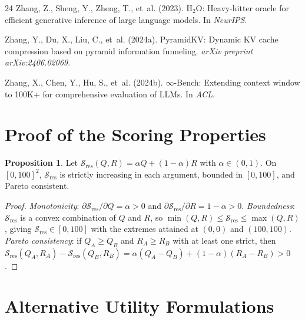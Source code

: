 \documentclass{article}
\theoremstyle{definition}
\newtheorem{proposition}{Proposition}
\newcommand{\Sres}{\mathcal{S}_{\text{res}}}
\begin{document}
\begin{thebibliography}{24}
 Zhang, Z., Sheng, Y., Zheng, T., et~al. (2023). $\text{H}_2\text{O}$: Heavy-hitter oracle for efficient generative inference of large language models. In \textit{NeurIPS}.

 Zhang, Y., Du, X., Liu, C., et~al. (2024a). PyramidKV: Dynamic KV cache compression based on pyramid information funneling. \textit{arXiv preprint arXiv:2406.02069}.

 Zhang, X., Chen, Y., Hu, S., et~al. (2024b). $\infty$-Bench: Extending context window to 100K+ for comprehensive evaluation of LLMs. In \textit{ACL}.

\end{thebibliography}
\endgroup

\clearpage
\appendix

\section{Proof of the Scoring Properties}
\label{app:proofs}

\begin{proposition}
Let $\Sres(Q,R) = \alpha Q + (1-\alpha) R$ with $\alpha \in (0,1)$. On $[0,100]^2$, $\Sres$ is strictly increasing in each argument, bounded in $[0,100]$, and Pareto consistent.
\end{proposition}

\begin{proof}
\emph{Monotonicity}: $\partial \Sres / \partial Q = \alpha > 0$ and $\partial \Sres / \partial R = 1 - \alpha > 0$.
\emph{Boundedness}: $\Sres$ is a convex combination of $Q$ and $R$, so $\min(Q,R) \le \Sres \le \max(Q,R)$, giving $\Sres \in [0,100]$ with the extremes attained at $(0,0)$ and $(100,100)$.
\emph{Pareto consistency}: if $Q_A \ge Q_B$ and $R_A \ge R_B$ with at least one strict, then $\Sres(Q_A,R_A) - \Sres(Q_B,R_B) = \alpha(Q_A - Q_B) + (1-\alpha)(R_A - R_B) > 0$.
\end{proof}

\section{Alternative Utility Formulations}
\label{app:formulations}
\end{document}
